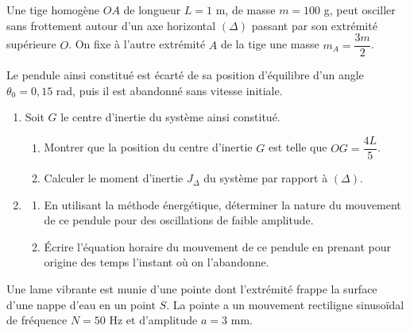 \documentclass[11pt]{article}
\begin{document}

\begin{minipage}{0.68\linewidth}
Une tige homogène $OA$ de longueur $L = 1$ m, de masse $m = 100$ g, peut osciller sans frottement autour d'un axe horizontal $(\Delta)$ passant par son extrémité supérieure $O$. On fixe à l'autre extrémité $A$ de la tige une masse $m_A = \dfrac{3m}{2}$.

Le pendule ainsi constitué est écarté de sa position d'équilibre d'un angle $\theta_0 = 0{,}15$ rad, puis il est abandonné sans vitesse initiale.
\end{minipage}\hfill
\begin{minipage}{0.28\linewidth}
\centering
{}
\end{minipage}

\begin{enumerate}
  \item Soit $G$ le centre d'inertie du système ainsi constitué.
  \begin{enumerate}[label=\alph*.]
    \item Montrer que la position du centre d'inertie $G$ est telle que $OG = \dfrac{4L}{5}$.
    \item Calculer le moment d'inertie $J_\Delta$ du système par rapport à $(\Delta)$.
  \end{enumerate}
  \item \begin{enumerate}[label=\alph*.]
    \item En utilisant la méthode énergétique, déterminer la nature du mouvement de ce pendule pour des oscillations de faible amplitude.
    \item Écrire l'équation horaire du mouvement de ce pendule en prenant pour origine des temps l'instant où on l'abandonne.
  \end{enumerate}
\end{enumerate}

Une lame vibrante est munie d'une pointe dont l'extrémité frappe la surface d'une nappe d'eau en un point $S$. La pointe a un mouvement rectiligne sinusoïdal de fréquence $N = 50$ Hz et d'amplitude $a = 3$ mm.
\end{document}
